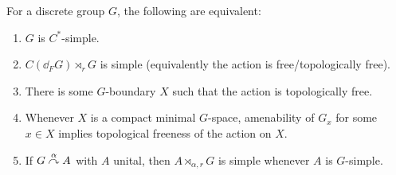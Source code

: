 \begin{theorem}
	For a discrete group $G$, the following are equivalent:
	\begin{enumerate}
		\item $G$ is $C^*$-simple.
		\item $C(\dd_F G) \rtimes_r G$ is simple (equivalently the action is free/topologically free).
		\item There is some $G$-boundary $X$ such that the action is topologically free.
		\item Whenever $X$ is a compact minimal $G$-space, amenability of $G_x$ for some $x \in X$ implies topological freeness of the action on $X$.
		\item If $G \stackrel{\alpha}{\curvearrowright} A$ with $A$ unital, then $A \rtimes_{\alpha,r} G$ is simple whenever $A$ is $G$-simple.
	\end{enumerate}
	\label{breulcsimple}
\end{theorem}
